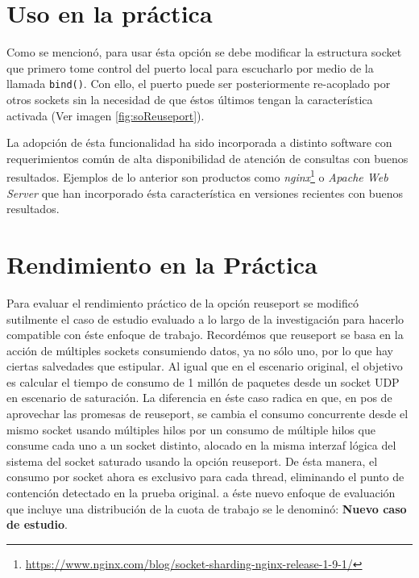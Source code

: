 \section{Uso en la práctica}
Como se mencionó, para usar ésta opción se debe modificar la estructura socket que primero tome control del puerto local para escucharlo por medio de la llamada \verb=bind()=. Con ello, el puerto puede ser posteriormente re-acoplado por otros sockets sin la necesidad de que éstos últimos tengan la característica activada (Ver imagen \ref{fig:soReuseport}).

La adopción de ésta funcionalidad ha sido incorporada a distinto software con requerimientos común de alta disponibilidad de atención de consultas con buenos resultados. Ejemplos de lo anterior son productos como \emph{nginx}\footnote{\url{https://www.nginx.com/blog/socket-sharding-nginx-release-1-9-1/}} o \emph{Apache Web Server} \cite{paper:apache} que han incorporado ésta característica en versiones recientes con buenos resultados.

\section{Rendimiento en la Práctica}
Para evaluar el rendimiento práctico de la opción reuseport se modificó sutilmente el caso de estudio evaluado a lo largo de la investigación para hacerlo compatible con éste enfoque de trabajo. Recordémos que reuseport se basa en la acción de múltiples sockets consumiendo datos, ya no sólo uno, por lo que hay ciertas salvedades que estipular. Al igual que en el escenario original, el objetivo es calcular el tiempo de consumo de 1 millón de paquetes desde un socket UDP en escenario de saturación. La diferencia en éste caso radica en que, en pos de aprovechar las promesas de reuseport, se cambia el consumo concurrente desde el mismo socket usando múltiples hilos por un consumo de múltiple hilos que consume cada uno a un socket distinto, alocado en la misma interzaf lógica del sistema del socket saturado usando la opción reuseport. De ésta manera, el consumo por socket ahora es exclusivo para cada thread, eliminando el punto de contención detectado en la prueba original. a éste nuevo enfoque de evaluación que incluye una distribución de la cuota de trabajo se le denominó: \textbf{Nuevo caso de estudio}.

